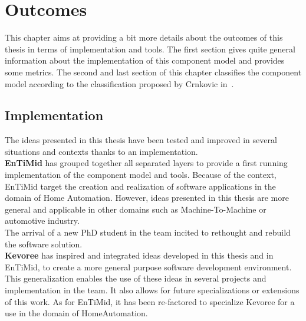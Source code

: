 \chapter{Outcomes}
\label{ch:outcomes}

This chapter aims at providing a bit more details about the outcomes of this thesis in terms of implementation and tools. The first section gives quite general information about the implementation of this component model and provides some metrics. The second and last section of this chapter classifies the component model according to the classification proposed by Crnkovic in~\cite{Crnkovic_1374:2007}.

\section{Implementation}

The ideas presented in this thesis have been tested and improved in several situations and contexts thanks to an implementation.\\

{\bf EnTiMid} has grouped together all separated layers to provide a first running implementation of the component model and tools. Because of the context, EnTiMid target the creation and realization of software applications in the domain of Home Automation. However, ideas presented in this thesis are more general and applicable in other domains such as Machine-To-Machine or automotive industry.\\
The arrival of a new PhD student in the team incited to rethought and rebuild the software solution.\\

{\bf Kevoree} has inspired and integrated ideas developed in this thesis and in EnTiMid, to create a more general purpose software development environment. This generalization enables the use of these ideas in several projects and implementation in the team. It also allows for future specializations or extensions of this work. As for EnTiMid, it has been re-factored to specialize Kevoree for a use in the domain of HomeAutomation.\\

